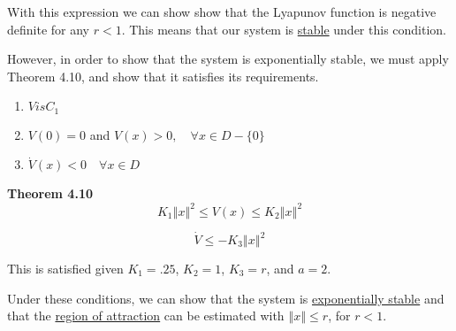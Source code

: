 \noindent With this expression we can show show that the Lyapunov function is negative definite for any $r<1$. This means that our system is \underline{stable} under this condition.

\noindent However, in order to show that the system is exponentially stable, we must apply Theorem 4.10, and show that it satisfies its requirements.

\begin{enumerate}
  \item $V is C_1$
  \item $V(0)= 0 $ and $V(x) > 0, \quad \forall x \in D - \{ 0\}$
  \item $\dot{V}(x) < 0 \quad \forall x \in D$
\end{enumerate}

\noindent \textbf{Theorem 4.10}
$$
K_1 \left\Vert x \right\Vert^2 \leq V(x) \leq K_2 \left\Vert x \right\Vert^2
$$


$$
\dot{V} \leq -K_3 \left\Vert x \right\Vert^2
$$


\noindent This is satisfied given $K_1 = .25$, $K_2 =1 $, $K_3 = r $, and $a =2$.


\noindent Under these conditions, we can show that the system is \underline{exponentially stable} and that the \underline{region of attraction} can be estimated with $\left \Vert x \right\Vert \leq r$, for $r <1$.
